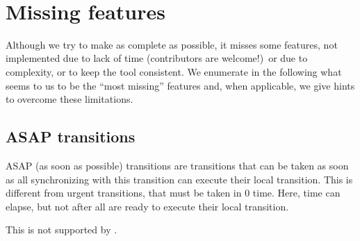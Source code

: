 \begin{multicols}{2}
	 \\
	 \\
	 \\
	 \\
	 \\
	 \\
	 \\
	 \\
	 \\
	 \\
	 \\
	 \\
	 \\
\end{multicols}


\chapter{Missing features}

Although we try to make \imitator{} as complete as possible, it misses some features, not implemented due to lack of time (contributors are welcome!)\ or due to complexity, or to keep the tool consistent.
We enumerate in the following what seems to us to be the ``most missing'' features and, when applicable, we give hints to overcome these limitations.



\section{ASAP transitions}

ASAP (as soon as possible) transitions are transitions that can be taken as soon as all \IPTA{} synchronizing with this transition can execute their local transition.
This is different from urgent transitions, that must be taken in 0 time.
Here, time can elapse, but not after all \IPTA{} are ready to execute their local transition.

This is not supported by \imitator{}. %



